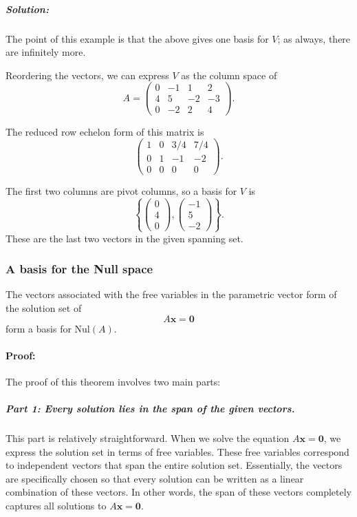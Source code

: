 \documentclass[a4paper,12pt]{article}
\begin{document}
\subparagraph{Solution:}

The point of this example is that the above gives one basis for \( V \); as always, there are infinitely more.

Reordering the vectors, we can express \( V \) as the column space of
\[
A = 
\begin{pmatrix}
0 & -1 & 1 & 2 \\
4 & 5 & -2 & -3 \\
0 & -2 & 2 & 4
\end{pmatrix}.
\]

The reduced row echelon form of this matrix is
\[
\begin{pmatrix}
1 & 0 & 3/4 & 7/4 \\
0 & 1 & -1 & -2 \\
0 & 0 & 0 & 0
\end{pmatrix}.
\]

The first two columns are pivot columns, so a basis for \( V \) is
\[
\left\{ 
\begin{pmatrix} 0 \\ 4 \\ 0 \end{pmatrix},
\begin{pmatrix} -1 \\ 5 \\ -2 \end{pmatrix}
\right\}.
\]
These are the last two vectors in the given spanning set.
\newpage
\subsubsection{A basis for the Null space}
\begin{tcolorbox}[title=Theorem,colframe=blue!70!black, colback=blue!5!white]
The vectors associated with the free variables in the parametric vector form of the solution set of 
\[
A \mathbf{x} = \mathbf{0}
\]
form a basis for \(\text{Nul}(A)\).
 \end{tcolorbox}
\paragraph{Proof:}
The proof of this theorem involves two main parts:

\subparagraph{Part 1: Every solution lies in the span of the given vectors.}
This part is relatively straightforward. When we solve the equation \(A \mathbf{x} = \mathbf{0}\), we express the solution set in terms of free variables. These free variables correspond to independent vectors that span the entire solution set. Essentially, the vectors are specifically chosen so that every solution can be written as a linear combination of these vectors. In other words, the span of these vectors completely captures all solutions to \(A \mathbf{x} = \mathbf{0}\).
\end{document}
